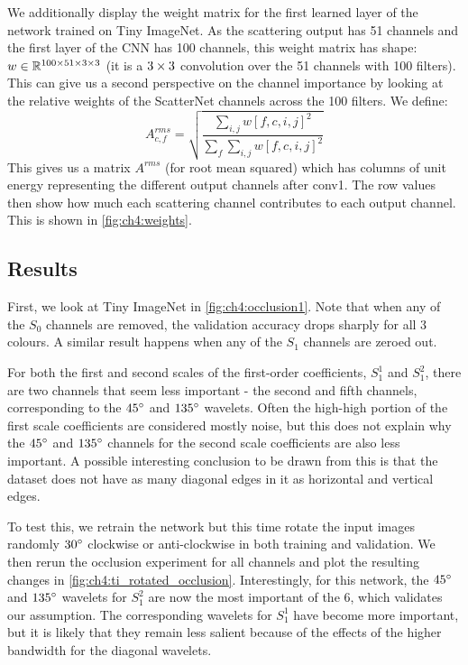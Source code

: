 We additionally display the weight matrix for the first learned layer of the
network trained on Tiny ImageNet. As the scattering output has 51 channels and
the first layer of the CNN has 100 channels, this weight matrix has shape:
$w\in \reals[100\x 51\x 3\x 3]$ (it is a $3\x 3$ convolution over the 51
channels with 100 filters). This can give us a second perspective on the
channel importance by looking at the relative weights of the ScatterNet channels
across the 100 filters. We define:
\begin{equation}\label{eq:ch4:arms}
  A^{rms}_{c, f} = \sqrt{ \frac{\sum_{i,j} w[f, c, i, j]^2}{{\sum_f \sum_{i,j} w[f, c, i, j]^2}} }
\end{equation}
This gives us a matrix $A^{rms}$ (for root mean squared) which has columns of
unit energy representing the different output channels after conv1. The row
values then show how much each scattering channel contributes to each output
channel. This is shown in \autoref{fig:ch4:weights}.

\subsection{Results}
First, we look at Tiny ImageNet in \autoref{fig:ch4:occlusion1}.
Note that when any of the $S_0$ channels are removed, 
the validation accuracy drops sharply for all 3 colours. A similar result
happens when any of the $S_1$ channels are zeroed out. 

For both the first and second scales of the first-order coefficients, 
$S_1^1$ and $S_1^2$, there are two channels that seem less
important - the second and fifth channels, corresponding to the $45\degs$ and
$135\degs$ wavelets. Often the high-high portion of the first scale coefficients
are considered mostly noise, but this does not explain why the $45\degs$
and $135\degs$ channels for the second scale coefficients are also less
important. A possible interesting conclusion to be drawn from this is that the
dataset does not have as many diagonal edges in it as horizontal and vertical
edges. 

To test this, we retrain the network but this time rotate the input
images randomly $30\degs$ clockwise or anti-clockwise in both training and
validation. We then rerun the occlusion experiment for all channels and plot the
resulting changes in \autoref{fig:ch4:ti_rotated_occlusion}. Interestingly, for
this network, the $45\degs$ and $135\degs$ wavelets for $S_1^2$ are now the most
important of the 6, which validates our assumption. The corresponding wavelets
for $S_1^1$ have become more important, but it is likely that they remain less
salient because of the effects of the higher bandwidth for the diagonal
wavelets.

